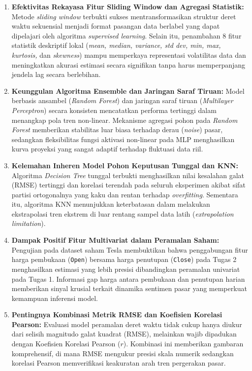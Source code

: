 \documentclass[a4paper,oneside,11pt]{book}
\begin{document}
\begin{enumerate}
    \item \textbf{Efektivitas Rekayasa Fitur Sliding Window dan Agregasi Statistik:} Metode \textit{sliding window} terbukti sukses mentransformasikan struktur deret waktu sekuensial menjadi format pasangan data berlabel yang dapat dipelajari oleh algoritma \textit{supervised learning}. Selain itu, penambahan 8 fitur statistik deskriptif lokal (\textit{mean, median, variance, std dev, min, max, kurtosis,} dan \textit{skewness}) mampu memperkaya representasi volatilitas data dan meningkatkan akurasi estimasi secara signifikan tanpa harus memperpanjang jendela lag secara berlebihan.
    
    \item \textbf{Keunggulan Algoritma Ensemble dan Jaringan Saraf Tiruan:} Model berbasis ansambel (\textit{Random Forest}) dan jaringan saraf tiruan (\textit{Multilayer Perceptron}) secara konsisten mencatatkan performa tertinggi dalam menangkap pola tren non-linear. Mekanisme agregasi pohon pada \textit{Random Forest} memberikan stabilitas luar biasa terhadap derau (\textit{noise}) pasar, sedangkan fleksibilitas fungsi aktivasi non-linear pada MLP menghasilkan kurva proyeksi yang sangat adaptif terhadap fluktuasi data riil.
    
    \item \textbf{Kelemahan Inheren Model Pohon Keputusan Tunggal dan KNN:} Algoritma \textit{Decision Tree} tunggal terbukti menghasilkan nilai kesalahan galat (RMSE) tertinggi dan korelasi terendah pada seluruh eksperimen akibat sifat partisi ortogonalnya yang kaku dan rentan terhadap \textit{overfitting}. Sementara itu, algoritma KNN menunjukkan keterbatasan dalam melakukan ekstrapolasi tren ekstrem di luar rentang sampel data latih (\textit{extrapolation limitation}).
    
    \item \textbf{Dampak Positif Fitur Multivariat dalam Peramalan Saham:} Pengujian pada dataset saham Tesla membuktikan bahwa penggabungan fitur harga pembukaan (\texttt{Open}) bersama harga penutupan (\texttt{Close}) pada Tugas 2 menghasilkan estimasi yang lebih presisi dibandingkan peramalan univariat pada Tugas 1. Informasi gap harga antara pembukaan dan penutupan harian memberikan sinyal krusial terkait dinamika sentimen pasar yang memperkuat kemampuan inferensi model.
    
    \item \textbf{Pentingnya Kombinasi Metrik RMSE dan Koefisien Korelasi Pearson:} Evaluasi model peramalan deret waktu tidak cukup hanya diukur dari selisih magnitudo galat kuadrat (RMSE), melainkan wajib dipadukan dengan Koefisien Korelasi Pearson ($r$). Kombinasi ini memberikan gambaran komprehensif, di mana RMSE mengukur presisi skala numerik sedangkan korelasi Pearson memverifikasi keakuratan arah tren pergerakan pasar.
\end{enumerate}
\end{document}

